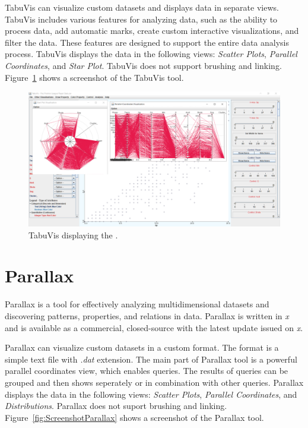 TabuVis can visualize custom datasets and displays data in separate views.
TabuVis includes various features for analyzing data, such as the ability
to process data, add automatic marks, create custom interactive
visualizations, and filter the data. These features are designed to
support the entire data analysis process. TabuVis displays the data in the
following views: \emph{Scatter Plots}, \emph{Parallel Coordinates}, and
\emph{Star Plot}. TabuVis does not support brushing and linking.
Figure~\ref{fig:ScreenshotTabuVis} shows a screenshot of the TabuVis tool.




\begin{figure}[tp]
\centering
\includegraphics[keepaspectratio,width=\linewidth,height=\halfh]
{images/screenshot-tabuvis.png}

\caption[TabuVis]
{%
TabuVis displaying the \cite{premierDataset}.
}
\label{fig:ScreenshotTabuVis}
\end{figure}



\section{Parallax}

Parallax \parencite{inselberg2008parallel} is a tool for effectively analyzing
multidimensional datasets and discovering patterns, properties, and
relations in data. Parallax is written in \emph{x} and is available as
a commercial, closed-source with the latest update issued on \emph{x}.

Parallax can visualize custom datasets in a custom format. The format is a
simple text file with \emph{.dat} extension. The main part of Parallax
tool is a powerful parallel coordinates view, which enables queries. The
results of queries can be grouped and then shows seperately or in
combination with other queries. Parallax displays the data in the
following views: \emph{Scatter Plots}, \emph{Parallel Coordinates}, and
\emph{Distributions}. Parallax does not suport brushing and linking.
Figure~\ref{fig:ScreenshotParallax} shows a screenshot of the Parallax tool.




